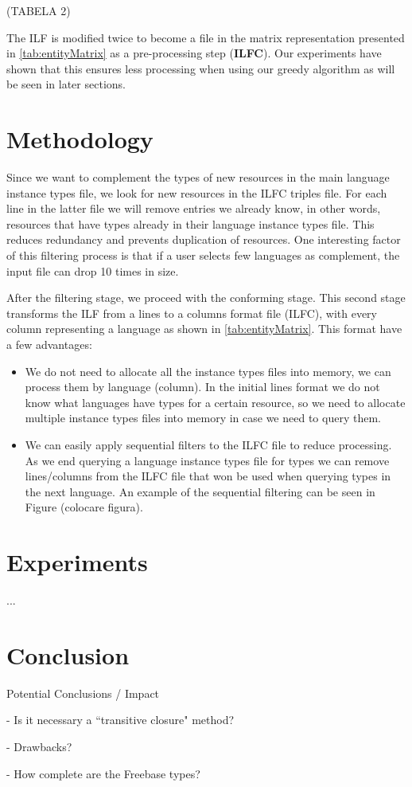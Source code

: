 \documentclass[10pt,a4paper]{llncs}
\begin{document}
(TABELA 2)

The ILF is modified twice to become a file in the matrix representation presented in \ref{tab:entityMatrix} as a pre-processing step (\textbf{ILFC}). Our experiments have shown that this ensures less processing when using our greedy algorithm as will be seen in later sections.

\section{Methodology}

Since we want to complement the types of new resources in the main language instance types file, we look for new resources in the ILFC triples file. For each line in the latter file we will remove entries we already know, in other words, resources that have types already in their language instance types file. This reduces redundancy and prevents duplication of resources. One interesting factor of this filtering process is that if a user selects few languages as complement, the input file can drop 10 times in size.

After the filtering stage, we proceed with the conforming stage. This second stage transforms the ILF from a lines to a columns format file (ILFC), with every column representing a language as shown in \ref{tab:entityMatrix}. This format have a few advantages:

\begin{itemize}
	\item We do not need to allocate all the instance types files into memory, we can process them by language (column). In the initial lines format we do not know what languages have types for a certain resource, so we need to allocate multiple instance types files into memory in case we need to query them.
	\item We can easily apply sequential filters to the ILFC file to reduce processing. As we end querying a language instance types file for types we can remove lines/columns from the ILFC file that won be used when querying types in the next language. An example of the sequential filtering can be seen in Figure (colocare figura).
\end{itemize}

\section{Experiments}

...


\section{Conclusion}

Potential Conclusions / Impact

- Is it necessary a ``transitive closure" method?

- Drawbacks?

- How complete are the Freebase types?




\end{document}
